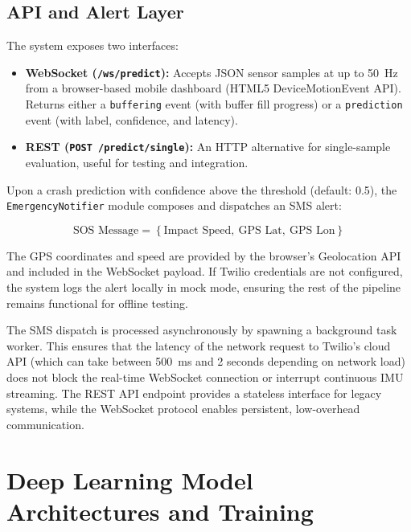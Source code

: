 \documentclass[journal]{IEEEtran}
\begin{document}
\subsection{API and Alert Layer}

The system exposes two interfaces:

\begin{itemize}
  \item \textbf{WebSocket (\texttt{/ws/predict}):} Accepts JSON sensor samples
        at up to 50~Hz from a browser-based mobile dashboard
        (HTML5 DeviceMotionEvent API). Returns either a \texttt{buffering}
        event (with buffer fill progress) or a \texttt{prediction} event
        (with label, confidence, and latency).

  \item \textbf{REST (\texttt{POST /predict/single}):} An HTTP alternative for
        single-sample evaluation, useful for testing and integration.
\end{itemize}

Upon a crash prediction with confidence above the threshold (default: 0.5), the
\texttt{EmergencyNotifier} module composes and dispatches an SMS alert:

\begin{equation}
  \text{SOS Message} = \left\{
    \text{Impact Speed},\ \text{GPS Lat},\ \text{GPS Lon}
  \right\}
  \label{eq:sos}
\end{equation}

The GPS coordinates and speed are provided by the browser's Geolocation API
and included in the WebSocket payload. If Twilio credentials are not configured,
the system logs the alert locally in mock mode, ensuring the rest of the pipeline
remains functional for offline testing.

The SMS dispatch is processed asynchronously by spawning a background task worker. This ensures that the latency of the network request to Twilio's cloud API (which can take between 500~ms and 2 seconds depending on network load) does not block the real-time WebSocket connection or interrupt continuous IMU streaming. The REST API endpoint provides a stateless interface for legacy systems, while the WebSocket protocol enables persistent, low-overhead communication.


\section{Deep Learning Model Architectures and Training}
\label{sec:models}
\end{document}
